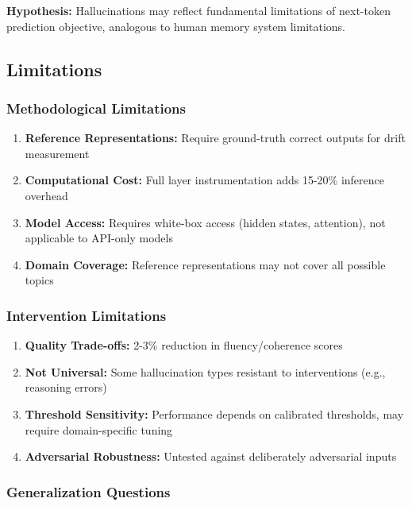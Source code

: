 \documentclass[11pt]{article}
\begin{document}
\textbf{Hypothesis:} Hallucinations may reflect fundamental limitations of next-token prediction objective, analogous to human memory system limitations.

\subsection{Limitations}

\subsubsection{Methodological Limitations}

\begin{enumerate}
    \item \textbf{Reference Representations:} Require ground-truth correct outputs for drift measurement
    \item \textbf{Computational Cost:} Full layer instrumentation adds 15-20\% inference overhead
    \item \textbf{Model Access:} Requires white-box access (hidden states, attention), not applicable to API-only models
    \item \textbf{Domain Coverage:} Reference representations may not cover all possible topics
\end{enumerate}

\subsubsection{Intervention Limitations}

\begin{enumerate}
    \item \textbf{Quality Trade-offs:} 2-3\% reduction in fluency/coherence scores
    \item \textbf{Not Universal:} Some hallucination types resistant to interventions (e.g., reasoning errors)
    \item \textbf{Threshold Sensitivity:} Performance depends on calibrated thresholds, may require domain-specific tuning
    \item \textbf{Adversarial Robustness:} Untested against deliberately adversarial inputs
\end{enumerate}

\subsubsection{Generalization Questions}
\end{document}
